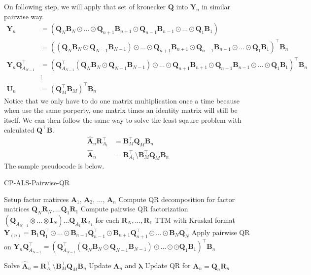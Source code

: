 \documentclass{article}
\newcommand{\mat}[1]{\mathbf{#1}}
\newcommand{\M}[2][]{\bm{#1{\mathbf{\MakeUppercase{#2}}}}} 		%
\newcommand{\T}[2][]{#1{\mathbf{\cal{#2}}}} 						%
\begin{document}
On following step, we will apply that set of kronecker $\mat{Q}$ into $\mat{Y}_n$ in similar pairwise way.
\begin{align}
  \mat{Y}_n   &= (\mat{Q}_N\mat{B}_N \odot \dots \odot \mat{Q}_{n+1} \mat{B}_{n+1} \odot \mat{Q}_{n-1}\mat{B}_{n-1} \odot \dots \odot \mat{Q}_{1}\mat{B}_{1}) \nonumber   \\
      &= ((\mat{Q}_N\mat{B}_N \odot \mat{Q}_{N-1}\mat{B}_{N-1}) \odot \dots \odot \mat{Q}_{n+1} \mat{B}_{n+1} \odot \mat{Q}_{n-1}\mat{B}_{n-1} \odot \dots \odot \mat{Q}_{1}\mat{B}_{1})^\top\mat{B}_n \nonumber      \\
      \mat{Y}_n\mat{Q}_{A_{N-1}}^\top  &= (\mat{Q}_{A_{N-1}}^\top(\mat{Q}_N\mat{B}_N \odot \mat{Q}_{N-1}\mat{B}_{N-1}) \odot \dots \odot \mat{Q}_{n+1} \mat{B}_{n+1} \odot \mat{Q}_{n-1}\mat{B}_{n-1} \odot \dots \odot \mat{Q}_{1}\mat{B}_{1})^\top\mat{B}_n \nonumber \\
      & \vdots \nonumber \\
    \mat{U}_n  &= (\mat{Q}_{M}^\top\mat{B}_M)^\top\mat{B}_n \nonumber  
\end{align}
Notice that we only have to do one matrix multiplication once a time because when use the same porperty, one matrix times an identity matrix will still be itself.
We can then follow the same way to solve the least sqaure problem with calculated $\mat{Q}^\top\mat{B}$.
\begin{align}
  \mat{\hat{A}}_n \mat{R}^\top_{A_1} &= \mat{B}^\top_M\mat{Q}_M\mat{B}_n \nonumber \\ 
  \mat{\hat{A}}_n &= \mat{R}^\top_{A_1} \text{\textbackslash} \mat{B}^\top_M\mat{Q}_M\mat{B}_n \nonumber 
\end{align}
The sample pseudocode is below.
\begin{algorithm}
  \caption{CP-ALS-Pairwise-QR}
  \label{alg:cp-als-pairwise-qr}
  \begin{algorithmic}[1]
    \Function{$[\bm{\lambda},\M{A}_{n}]=$ CP-ALS}{$\T{X},R$}
      \State Setup factor matirces  $\mat{A}_1$, $\mat{A}_2$, $\dots$, $\mat{A}_n$
      \State Compute QR decomposition for factor matrices $\mat{Q}_N\mat{R}_N, \dots \mat{Q}_1\mat{R}_1$
      \State Compute pairwise QR factorization $(\mat{Q}_{A_{N-1}} \otimes \dots  \otimes  \mat{I}_N) \dots \mat{Q}_{A_{1}}\mat{R}_{A_{1}}$ for each $\mat{R}_N, \dots, \mat{R}_1$
      \State TTM with Kruskal format $\mat{Y}_{(n)} = \mat{B}_1\mat{Q}^\top_1 \odot \dots \odot \mat{B}_{n-1}\mat{Q}^\top_{n-1}\odot \mat{B}_{n+1}\mat{Q}^\top_{n+1} \odot \dots \odot \mat{B}_N\mat{Q}^\top_N$
      \State Apply pairwise QR on $\mat{Y}_n\mat{Q}_{A_{N-1}}^\top  = (\mat{Q}_{A_{N-1}}^\top(\mat{Q}_N\mat{B}_N \odot \mat{Q}_{N-1}\mat{B}_{N-1}) \odot \dots \odot  \odot \mat{Q}_{1}\mat{B}_{1})^\top\mat{B}_n $
      
      \State Solve $  \mat{\hat{A}}_n = \mat{R}^\top_{A_1} \text{\textbackslash} \mat{B}^\top_M\mat{Q}_M\mat{B}_n $
      \State Update $\mat{A}_n$ and $\bm{\lambda}$
      \State Update QR for $\mat{A}_n = \mat{Q}_n\mat{R}_n$      
      \EndFor
      \EndWhile
    \EndFunction
  \end{algorithmic}
\end{algorithm}
\end{document}
